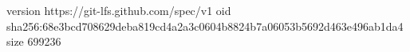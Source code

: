 version https://git-lfs.github.com/spec/v1
oid sha256:68e3bcd708629deba819cd4a2a3c0604b8824b7a06053b5692d463e496ab1da4
size 699236
